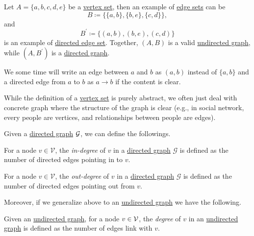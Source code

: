 \begin{eg}
	Let \(A = \{a, b, c, d, e\}\) be a \hyperref[def:vertex-set]{vertex set}, then an example of \hyperref[def:edge-set]{edge sets} can be
	\[
		B \coloneqq \{\{a, b\}, \{b, e\}, \{c, d\}\},
	\]
	and
	\[
		B^\prime \coloneqq \{(a, b), (b, e), (c, d)\}
	\]
	is an example of \hyperref[def:directed-edge-set]{directed edge set}. Together, \((A, B)\) is a valid \hyperref[def:undirected-graph]{undirected graph}, while \((A, B^\prime )\) is a \hyperref[def:directed-graph]{directed graph}.
\end{eg}

\begin{notation}
	We some time will write an edge between \(a\) and \(b\) as \((a, b)\) instead of \(\{a, b\}\) and a directed edge from \(a\) to \(b\) as \(a\to b\) if the content is clear.
\end{notation}

\begin{note}
	While the definition of a \hyperref[def:vertex-set]{vertex set} is purely abstract, we often just deal with concrete graph where the structure of the graph is clear (e.g., in social network, every people are vertices, and relationships between people are edges).
\end{note}

\begin{definition*}
	Given a \hyperref[def:directed-graph]{directed graph} \(\mathcal{\MakeUppercase{g}} \), we can define the followings.
	\begin{definition}[In-degree]\label{def:in-degree}
		For a node \(v\in\mathcal{V}\), the \emph{in-degree} of \(v\) in a \hyperref[def:directed-graph]{directed graph} \(\mathcal{G}\) is defined as the number of directed edges pointing in to \(v\).
	\end{definition}

	\begin{definition}\label{def:out-degree}
		For a node \(v\in\mathcal{V}\), the \emph{out-degree} of \(v\) in a \hyperref[def:directed-graph]{directed graph} \(\mathcal{G}\) is defined as the number of directed edges pointing out from \(v\).
	\end{definition}
\end{definition*}

Moreover, if we generalize above to an \hyperref[def:undirected-graph]{undirected graph} we have the following.
\begin{definition}[Degree]\label{def:degree}
	Given an \hyperref[def:undirected-graph]{undirected graph}, for a node \(v\in \mathcal{\MakeUppercase{v}} \), the \emph{degree} of \(v\) in an \hyperref[def:undirected-graph]{undirected graph} is defined as the number of edges link with \(v\).
\end{definition}

